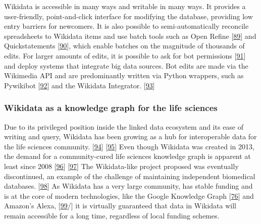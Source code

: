 Wikidata is accessible in many ways and writable in many ways.
It provides a user-friendly, point-and-click interface for modifying the database, providing low entry barriers for newcomers.
It is also possible to semi-automatically reconcile spreadsheets to Wikidata items and use batch tools such as Open Refine {[}\protect\hyperlink{ref-17rRjL1Xj}{89}{]} and Quickstatements {[}\protect\hyperlink{ref-K6ggpwRg}{90}{]}, which enable batches on the magnitude of thousands of edits.
For larger amounts of edits, it is possible to ask for bot permissions {[}\protect\hyperlink{ref-sSH04fxa}{91}{]} and deploy systems that integrate big data sources.
Bot edits are made via the Wikimedia API and are predominantly written via Python wrappers, such as Pywikibot {[}\protect\hyperlink{ref-5K5MfnVl}{92}{]} and the Wikidata Integrator. {[}\protect\hyperlink{ref-qDI8I4IJ}{93}{]}

\hypertarget{wikidata-as-a-knowledge-graph-for-the-life-sciences}{%
\subsubsection{Wikidata as a knowledge graph for the life sciences}\label{wikidata-as-a-knowledge-graph-for-the-life-sciences}}

Due to its privileged position inside the linked data ecosystem and its ease of writing and query, Wikidata has been growing as a hub for interoperable data for the life sciences community. {[}\protect\hyperlink{ref-3GqlN9Dk}{94}{]} {[}\protect\hyperlink{ref-Ym2HoRLl}{95}{]}
Even though Wikidata was created in 2013, the demand for a community-cured life sciences knowledge graph is apparent at least since 2008 {[}\protect\hyperlink{ref-179mXrGIk}{96}{]} {[}\protect\hyperlink{ref-TItj7EYf}{97}{]}
The Wikidata-like project proposed was eventually discontinued, an example of the challenge of maintaining independent biomedical databases. {[}\protect\hyperlink{ref-P2QdZvGc}{98}{]}
As Wikidata has a very large community, has stable funding and is at the core of modern technologies, like the Google Knowledge Graph {[}\protect\hyperlink{ref-xLpRePoh}{76}{]} and Amazon's Alexa, {[}\protect\hyperlink{ref-bO7BekzO}{99}/{]} it is virtually guaranteed that data in Wikidata will remain accessible for a long time, regardless of local funding schemes.

